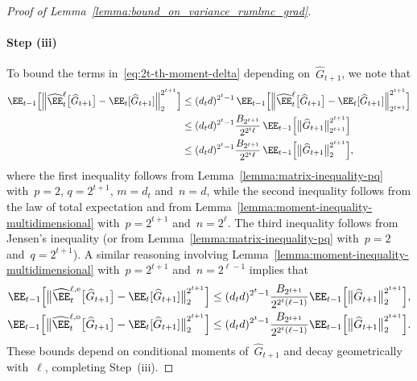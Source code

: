 \documentclass[11pt]{article}
\let\hat\widehat
\begin{document}
\begin{proof}[Proof of Lemma~\ref{lemma:bound_on_variance_rumlmc_grad}]
\paragraph{Step (iii)} To bound the terms in~\eqref{eq:2t-th-moment-delta} depending on~$\hat{G}_{t+1}$, we note that
\begin{align*}
    \EE_{t-1} \Big[ \Big\|\hat\EE_t^{\ell}\big[\hat{G}_{t+1}\big] -\EE_t[\hat{G}_{t+1}]  \Big\|_{2}^{2^{t+1}}\Big] & \leq (d_t d)^{2^t-1} \, \EE_{t-1} \Big[ \Big\|\hat\EE_t^{\ell}\big[\hat{G}_{t+1}\big] -\EE_t[\hat{G}_{t+1}]  \Big\|_{2^{t+1}}^{2^{t+1}}\Big] \\
    & \leq (d_t d)^{2^t-1} \frac{B_{2^{t+1}}}{2^{2^{t}\ell}} \, \EE_{t-1}\Big[\big\|\hat{G}_{t+1}\big\|_{2^{t+1}}^{2^{t+1}}\Big]\\
    & \leq (d_t d)^{2^t-1} \frac{B_{2^{t+1}}}{2^{2^{t}\ell}} \, \EE_{t-1}\Big[\big\|\hat{G}_{t+1}\big\|_{2}^{2^{t+1}}\Big],
\end{align*}
where the first inequality follows from Lemma~\ref{lemma:matrix-inequality-pq} with~$p=2$, $q=2^{t+1}$, $m=d_{t}$ and~$n=d$, while the second inequality follows from the law of total expectation and from Lemma~\ref{lemma:moment-inequality-multidimensional} with~$p=2^{t+1}$ and~$n=2^\ell$. The third inequality follows from Jensen's inequality (or from Lemma~\ref{lemma:matrix-inequality-pq} with~$p=2$ and~$q=2^{t+1}$). 
A similar reasoning involving Lemma~\ref{lemma:moment-inequality-multidimensional} with~$p=2^{t+1}$ and~$n=2^{\ell-1}$ implies that
\begin{align*}
    \EE_{t-1}\Big[\big\|\hat\EE_t^{\ell, {\rm e}}\big[\hat{G}_{t+1}\big] - \EE_t[\hat{G}_{t+1}] \big\|_{2}^{2^{t+1}}\Big] & 
    \leq (d_t d)^{2^t-1} \frac{B_{2^{t+1}}}{2^{2^{t}(\ell-1)}} \EE_{t-1}\Big[\big\|\hat{G}_{t+1}\big\|_{2}^{2^{t+1}}\Big],\\
    \EE_{t-1}\Big[\big\|\hat\EE_t^{\ell, {\rm o}}\big[\hat{G}_{t+1}\big] - \EE_t[\hat{G}_{t+1}] \big\|_{2}^{2^{t+1}}\Big] 
    & \leq (d_t d)^{2^t-1} \frac{B_{2^{t+1}}}{2^{2^{t}(\ell-1)}} \EE_{t-1}\Big[\big\|\hat{G}_{t+1}\big\|_{2}^{2^{t+1}}\Big].
\end{align*}
These bounds depend on conditional moments of~$\hat G_{t+1}$ and decay geometrically with~$\ell$, completing Step~(iii).


\end{proof}
\end{document}
